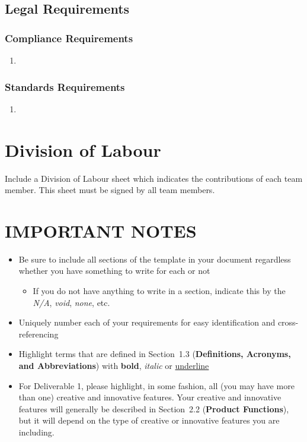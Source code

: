 \documentclass[]{article}
\begin{document}

\subsection{Legal Requirements}
\label{sub:legal_requirements}

\subsubsection{Compliance Requirements}
\label{ssub:compliance_requirements}
\begin{enumerate}[{LR-COMP}1. ]
	\item 
\end{enumerate}

\subsubsection{Standards Requirements}
\label{ssub:standards_requirements}
\begin{enumerate}[{LR-STD}1. ]
	\item 
\end{enumerate}



\appendix
\section{Division of Labour}
\label{sec:division_of_labour}
Include a Division of Labour sheet which indicates the contributions of each team member. This sheet must be signed by all team members.

\newpage
\section*{IMPORTANT NOTES}
\begin{itemize}
	\item Be sure to include all sections of the template in your document regardless whether you have something to write for each or not
	\begin{itemize}
		\item If you do not have anything to write in a section, indicate this by the \emph{N/A}, \emph{void}, \emph{none}, etc.
	\end{itemize}
	\item Uniquely number each of your requirements for easy identification and cross-referencing
	\item Highlight terms that are defined in Section~1.3 (\textbf{Definitions, Acronyms, and Abbreviations}) with \textbf{bold}, \emph{italic} or \underline{underline}
	\item For Deliverable 1, please highlight, in some fashion, all (you may have more than one) creative and innovative features. Your creative and innovative features will generally be described in Section~2.2 (\textbf{Product Functions}), but it will depend on the type of creative or innovative features you are including.
\end{itemize}
\end{document}
